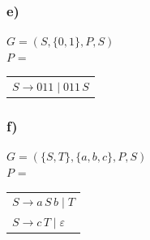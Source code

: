         \subsubsection*{e)}
            $G = (S, \{0,1\}, P, S)$ \\
            $P$ =
            \begin{tabular}[t]{l}
                \quad $S \rightarrow 011 \mid 011\,S$
            \end{tabular}

        \subsubsection*{f)}
            $G = (\{S,T\}, \{a,b,c\}, P, S)$ \\
            $P$ =
            \begin{tabular}[t]{l}
                \quad $S \rightarrow a\,S\,b \mid T$ \\
                \quad $S \rightarrow c\,T \mid \varepsilon$
            \end{tabular}